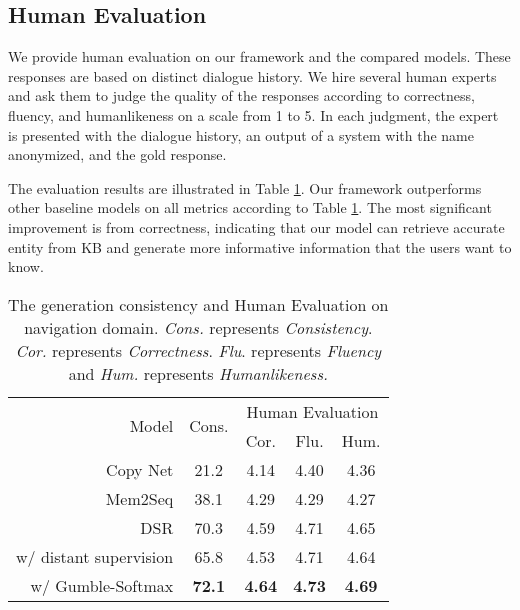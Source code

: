 \documentclass[11pt,a4paper]{article}
\begin{document}
 \subsection{Human Evaluation}
 		We provide human evaluation on our framework 
 	and the compared models.
These responses are based on distinct dialogue history.
 	We hire several human experts and ask them to judge
the quality of the responses according to correctness, fluency, and humanlikeness on a scale from 1 to 5. 
 	In each judgment, the expert is presented
 	with the dialogue history,
 	an output of a system with the name anonymized,
 	and the gold response.

 	The evaluation results are illustrated in Table \ref{tbl:consistency}. 
 	Our framework 
 	outperforms other baseline models on all metrics according to Table \ref{tbl:consistency}.
 	The most significant improvement is from correctness, 
 	indicating that our model can retrieve accurate entity from KB and generate more informative information that the users want to know.
 	\begin{table}[t]
 		
 		\centering
 			\begin{adjustbox}{width=0.4\textwidth}
 		\begin{tabular}{r|c||ccc}
 			\hline
 			
\multirow{2}{*}{Model}&
 			\multirow{2}{*}{Cons.}&
 			\multicolumn{3}{c}{Human Evaluation} \\
 			
 			\cline{3-5}
 			& & Cor. & Flu. & Hum. \\
 			
 			\hline
 			Copy Net & 21.2 &4.14&4.40&4.36\\
Mem2Seq & 38.1& 4.29& 4.29& 4.27 \\
DSR & 70.3& 4.59& 4.71& 4.65 \\
 			\hline
 			w/ distant supervision& 65.8& 4.53 & 4.71 & 4.64  \\
 			w/ Gumble-Softmax & \textbf{72.1}&\textbf{4.64}& \textbf{4.73}& \textbf{4.69} \\
 			\hline
 		\end{tabular}
 	\end{adjustbox}
 		\caption{The generation consistency and Human Evaluation on navigation domain. \textit{Cons.} represents \textit{Consistency}. \textit{Cor.} represents \textit{Correctness}. \textit{Flu}. represents \textit{Fluency} and \textit{Hum.} represents 
 			\textit{Humanlikeness.}}\label{tbl:consistency}
 	\end{table}
\end{document}
